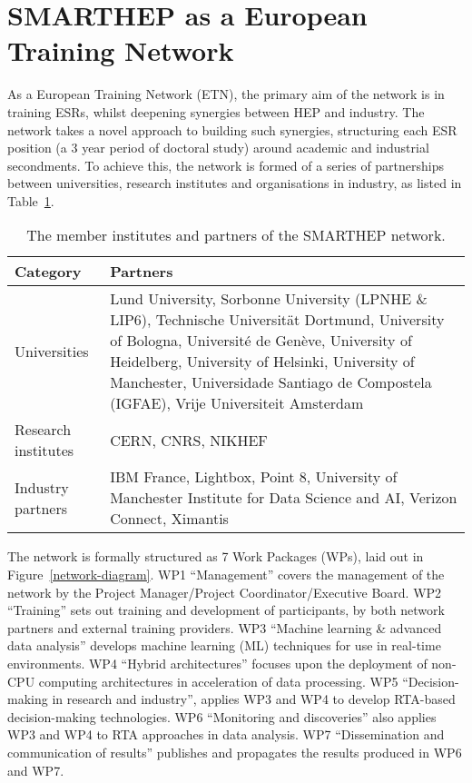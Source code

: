 \section{SMARTHEP as a European Training Network}
\label{network}
As a European Training Network (ETN), the primary aim of the network is in training ESRs, whilst deepening synergies between HEP and industry. The network takes a novel approach to building such synergies, structuring each ESR position (a 3 year period of doctoral study) around academic and industrial secondments. To achieve this, the network is formed of a series of partnerships between universities, research institutes and organisations in industry, as listed in Table~\ref{partners}.

\begin{table}[h!]
    \centering
    \small
    \begin{tabular}{p{2.5cm}p{9.5cm}}
    \hline
    Category & Partners \\\hline
    Universities & Lund University, Sorbonne University (LPNHE \& LIP6), Technische Universit\"at Dortmund, University of Bologna, Universit{\'e} de Gen{\`e}ve, University of Heidelberg, University of Helsinki, University of Manchester, Universidade Santiago de Compostela (IGFAE), Vrije Universiteit Amsterdam \\\hline
    Research institutes & CERN, CNRS, NIKHEF  \\\hline
    Industry partners & IBM France, Lightbox, Point 8, University of Manchester Institute for Data Science and AI, Verizon Connect, Ximantis\\\hline
    \end{tabular}
    \caption{The member institutes and partners of the SMARTHEP network.}
    \label{partners}       
\end{table}

The network is formally structured as 7 Work Packages (WPs), laid out in Figure~\ref{network-diagram}. WP1 ``Management'' covers the management of the network by the Project Manager/Project Coordinator/Executive Board. WP2 ``Training'' sets out training and development of participants, by both network partners and external training providers. WP3 ``Machine learning \& advanced data analysis'' develops machine learning (ML) techniques for use in real-time environments. WP4 ``Hybrid architectures'' focuses upon the deployment of non-CPU computing architectures in acceleration of data processing. WP5 ``Decision-making in research and industry'', applies WP3 and WP4 to develop RTA-based decision-making technologies. WP6 ``Monitoring and discoveries'' also applies WP3 and WP4 to RTA approaches in data analysis. WP7 ``Dissemination and communication of results'' publishes and propagates the results produced in WP6 and WP7.

